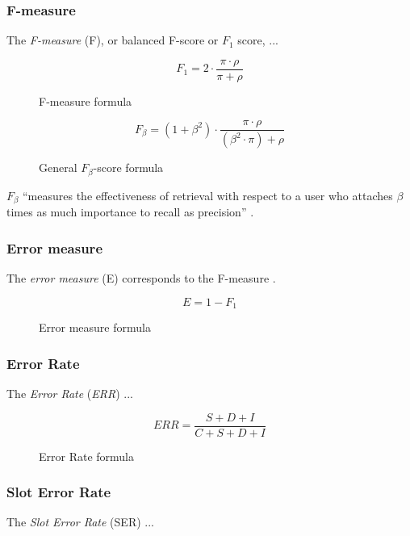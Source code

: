 \subsubsection{F-measure}
The \textit{F-measure} (F), or  balanced F-score or $\textit{F}_\textit{1}$ score, ...

\begin{figure}[H]
\begin{displaymath}
	\textit{F}_\textit{1} = 2 \cdot \frac{\pi \cdot \rho}{\pi + \rho}
\end{displaymath}
\caption{F-measure formula}
\end{figure}

\begin{figure}[H]
\begin{displaymath}
	\textit{F}_\beta = (1+\beta^2) \cdot \frac{\pi \cdot \rho}{(\beta^2 \cdot \pi) + \rho}
\end{displaymath}
\caption{General $\textit{F}_\beta$-score formula}
\end{figure}

$\textit{F}_\beta$ \enquote{measures the effectiveness of retrieval with respect to a user who attaches $\beta$ times as much importance to recall as precision} \cite{Rijsbergen:1979}.

\subsubsection{Error measure}
The \textit{error measure} (E) corresponds to the F-measure \cite{Feilmayr:2012}.

\begin{figure}[H]
\begin{displaymath}
	\textit{E} = 1 - \textit{F}_1
\end{displaymath}
\caption{Error measure formula}
\end{figure}

\subsubsection{Error Rate}
The \textit{Error Rate} (\textit{ERR}) ...

\begin{figure}[H]
\begin{displaymath}
	\textit{ERR} = \frac{S+D+I}{C+S+D+I}
\end{displaymath}
\caption{Error Rate formula}
\end{figure}

\subsubsection{Slot Error Rate}
The \textit{Slot Error Rate} (SER) ... 

